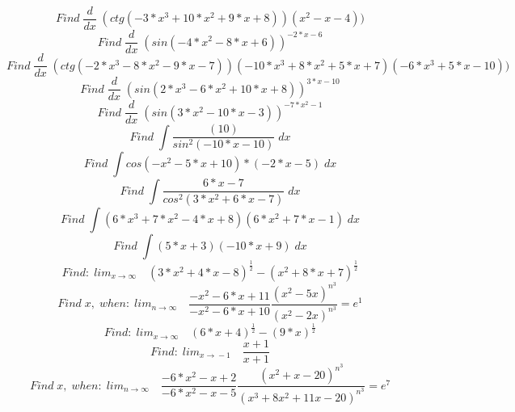 \documentclass[12pt]{article}
\begin{document}
\[
Find\; \frac{d}{dx}\;(ctg(-3*x^{3}+10*x^{2}+9*x+8))(x^{2}-x-4))
\]
\[
Find\; \frac{d}{dx}\;(sin(-4*x^{2}-8*x+6))^{-2*x-6}
\]
\[
Find\; \frac{d}{dx}\;(ctg(-2*x^{3}-8*x^{2}-9*x-7))(-10*x^{3}+8*x^{2}+5*x+7)(-6*x^{3}+5*x-10))
\]
\[
Find\; \frac{d}{dx}\;(sin(2*x^{3}-6*x^{2}+10*x+8))^{3*x-10}
\]
\[
Find\; \frac{d}{dx}\;(sin(3*x^{2}-10*x-3))^{-7*x^{2}-1}
\]
\[
Find\;\int \frac{(10)}{sin^2(-10*x-10)}\;dx
\]
\[
Find\;\int cos(-x^{2}-5*x+10)*(-2*x-5)\;dx
\]
\[
Find\;\int \frac{6*x-7}{cos^2(3*x^{2}+6*x-7)}\;dx
\]
\[
Find\;\int (6*x^{3}+7*x^{2}-4*x+8)(6*x^{2}+7*x-1)\;dx
\]
\[
Find\;\int (5*x+3)(-10*x+9)\;dx
\]
\[
Find:\;lim_{x\to\infty}\quad (3*x^{2}+4*x-8)^{\frac{1}{2}}-(x^{2}+8*x+7)^{\frac{1}{2}}
\]
\[
Find \; x,\;  when: \;lim_{n\to\infty}\quad \frac{-x^{2}-6*x+11}{-x^{2}-6*x+10}\frac{(x^{2}-5x)^{n^3}}{(x^{2}-2x)^{n^3}}=e^{1}
\]
\[
Find:\;lim_{x\to\infty}\quad (6*x+4)^{\frac{1}{2}}-(9*x)^{\frac{1}{2}}
\]
\[
Find:\;lim_{x\to\!-1}\quad \frac{x+1}{x+1}
\]
\[
Find \; x,\;  when: \;lim_{n\to\infty}\quad \frac{-6*x^{2}-x+2}{-6*x^{2}-x-5}\frac{(x^{2}+x-20)^{n^3}}{(x^{3}+8x^{2}+11x-20)^{n^3}}=e^{7}
\]
\end{document}
